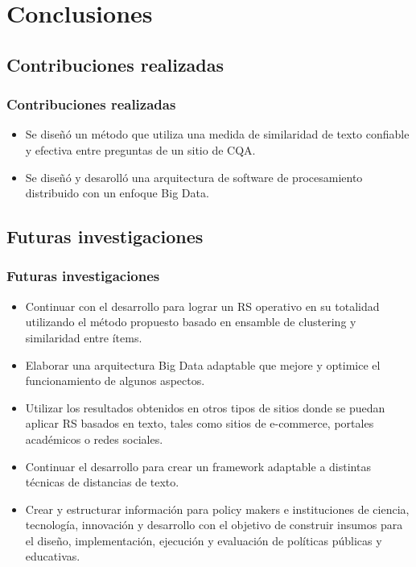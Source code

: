 \section{Conclusiones}

\subsection{Contribuciones realizadas}
\begin{frame}
	\frametitle{Contribuciones realizadas}
	\begin{itemize}
		\item Se diseñó un método que utiliza una medida de similaridad de texto confiable y efectiva entre preguntas de un sitio de CQA.
		\item Se diseñó y desarolló una arquitectura de software de procesamiento distribuido con un enfoque Big Data.
	\end{itemize}
\end{frame}

\subsection{Futuras investigaciones}
\begin{frame}
	\frametitle{Futuras investigaciones}
	\begin{itemize}
		\item Continuar con el desarrollo para lograr un RS operativo en su totalidad utilizando el método propuesto basado en ensamble de clustering y similaridad entre ítems.
		\item Elaborar una arquitectura Big Data adaptable que mejore y optimice el funcionamiento de algunos aspectos.
		\item Utilizar los resultados obtenidos en otros tipos de sitios donde se puedan aplicar RS basados en texto, tales como sitios de e-commerce, portales académicos o redes sociales.
		\item Continuar el desarrollo para crear un framework adaptable a distintas técnicas de distancias de texto.
		\item Crear y estructurar información para policy makers e instituciones de ciencia, tecnología, innovación y desarrollo con el objetivo de construir insumos para el diseño, implementación, ejecución y evaluación de políticas públicas y educativas.
	\end{itemize}
\end{frame}